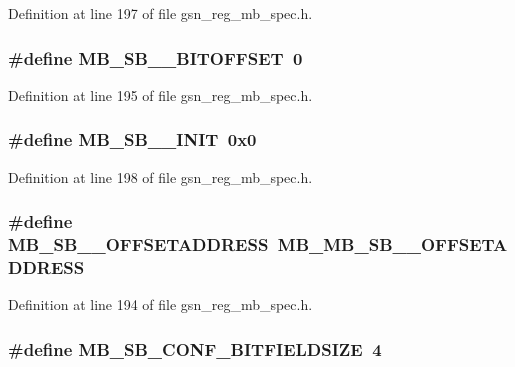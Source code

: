 Definition at line 197 of file gsn\_\-reg\_\-mb\_\-spec.h.

\hypertarget{a00562_a08c188e8443baaa53b5488a99913ae27}{
\subsubsection[{MB\_\-SB\_\-1\_\-BITOFFSET}]{\setlength{\rightskip}{0pt plus 5cm}\#define MB\_\-SB\_\_\-BITOFFSET~0}}
\label{a00562_a08c188e8443baaa53b5488a99913ae27}


Definition at line 195 of file gsn\_\-reg\_\-mb\_\-spec.h.

\hypertarget{a00562_abf9a1c23cf38a70fed0c12823a44f337}{
\subsubsection[{MB\_\-SB\_\-1\_\-INIT}]{\setlength{\rightskip}{0pt plus 5cm}\#define MB\_\-SB\_\_\-INIT~0x0}}
\label{a00562_abf9a1c23cf38a70fed0c12823a44f337}


Definition at line 198 of file gsn\_\-reg\_\-mb\_\-spec.h.

\hypertarget{a00562_ac4e4557bc1f3997c608aee00bf6163a6}{
\subsubsection[{MB\_\-SB\_\-1\_\-OFFSETADDRESS}]{\setlength{\rightskip}{0pt plus 5cm}\#define MB\_\-SB\_\_\-OFFSETADDRESS~MB\_\-MB\_\-SB\_\_\-OFFSETADDRESS}}
\label{a00562_ac4e4557bc1f3997c608aee00bf6163a6}


Definition at line 194 of file gsn\_\-reg\_\-mb\_\-spec.h.

\hypertarget{a00562_a21d36de093931482494c5856ac37b13d}{
\subsubsection[{MB\_\-SB\_\-CONF\_\-BITFIELDSIZE}]{\setlength{\rightskip}{0pt plus 5cm}\#define MB\_\-SB\_\-CONF\_\-BITFIELDSIZE~4}}
\label{a00562_a21d36de093931482494c5856ac37b13d}


